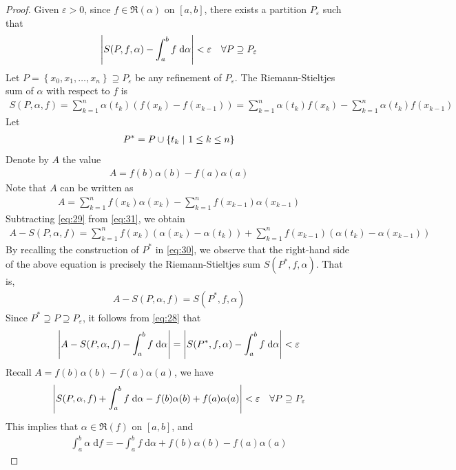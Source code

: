 \documentclass[thmcnt=section, 12pt]{my-elegantbook}
\begin{document}
\begin{proof}
    Given $\varepsilon > 0$, since $f \in \mathfrak{R}(\alpha)$ on $[a, b]$, there exists a partition $P_\varepsilon$ such that 
    \begin{align}
        \left\lvert S(P, f, \alpha) - \int_a^b f \; \mathrm{d}\alpha \right\rvert < \varepsilon
        \quad \forall P \supseteq P_\varepsilon
        \label{eq:28}
    \end{align}
    Let $P = \left\{x_0, x_1, \ldots, x_n\right\} \supseteq P_\varepsilon$ be any refinement of $P_\varepsilon$. The Riemann-Stieltjes sum of $\alpha$ with respect to $f$ is 
    \begin{align}
        S(P, \alpha, f)
        = \sum_{k=1}^n \alpha(t_k) (f(x_k) - f(x_{k-1}))
        = \sum_{k=1}^n \alpha(t_k) f(x_k)
        - \sum_{k=1}^n \alpha(t_k) f(x_{k-1})
        \label{eq:29}
    \end{align}
    Let 
    \begin{align}
        P^\ast = P \cup \left\{ t_k \ \middle| \ 1 \leq k \leq n \right\}
        \label{eq:30}
    \end{align}
    Denote by $A$ the value 
    \begin{align*}
        A = f(b)\alpha(b) - f(a)\alpha(a)
    \end{align*}
    Note that $A$ can be written as 
    \begin{align}
        A = \sum_{k=1}^n f(x_k) \alpha(x_k)
        - \sum_{k=1}^n f(x_{k-1}) \alpha(x_{k-1})
        \label{eq:31}
    \end{align}
    Subtracting \eqref{eq:29} from \eqref{eq:31}, we obtain
    \begin{align*}
        A - S(P, \alpha, f)
        = \sum_{k=1}^n f(x_k) (\alpha(x_k) - \alpha(t_k))
        + \sum_{k=1}^n f(x_{k-1}) (\alpha(t_k) - \alpha(x_{k-1}))
    \end{align*}
    By recalling the construction of $P^\ast$ in \eqref{eq:30}, we observe that the right-hand side of the above equation is precisely the Riemann-Stieltjes sum $S(P^\ast, f, \alpha)$. That is, 
    \begin{align*}
        A - S(P, \alpha, f) = S(P^\ast, f, \alpha)
    \end{align*}
    Since $P^\ast \supseteq P \supseteq P_\varepsilon$, it follows from \eqref{eq:28} that 
    \begin{align*}
        \left\lvert A - S(P, \alpha, f) - \int_a^b f \; \mathrm{d}\alpha \right\rvert 
        = \left\lvert S(P^\ast, f, \alpha) - \int_a^b f \; \mathrm{d}\alpha \right\rvert
        < \varepsilon
    \end{align*}
    Recall $A = f(b)\alpha(b) - f(a)\alpha(a)$, we have 
    \begin{align*}
        \left\lvert S(P, \alpha, f) + \int_a^b f \; \mathrm{d}\alpha - f(b)\alpha(b) + f(a)\alpha(a) \right\rvert < \varepsilon
        \quad \forall P \supseteq P_\varepsilon
    \end{align*}
    This implies that $\alpha \in \mathfrak{R}(f)$ on $[a, b]$, and 
    \begin{align*}
        \int_a^b \alpha \;\mathrm{d} f
        = -\int_a^b f \;\mathrm{d}\alpha 
        + f(b)\alpha(b) - f(a)\alpha(a)
    \end{align*}
\end{proof}
\end{document}
